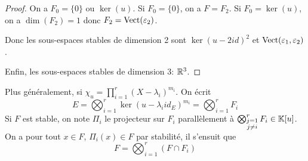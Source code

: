 \documentclass[12pt]{article}
\begin{document}
\begin{proof}
	On a $F_{0}=\lbrace0\rbrace$ ou $\ker(u)$. Si $F_{0}=\lbrace0\rbrace$, on a $F=F_{2}$. Si $F_{0}=\ker(u)$, on a $\dim(F_{2})=1$ donc $F_{2}=\operatorname{Vect}(\varepsilon_{2})$.

	Donc les sous-espaces stables de dimension 2 sont $\ker(u-2id)^{2}$ et $\operatorname{Vect}(\varepsilon_{1},\varepsilon_{2})$. 

	Enfin, les sous-espaces stables de dimension 3: $\mathbb{R}^{3}$.
\end{proof}

\begin{remark}
	Plus généralement, si $\chi_{u}=\prod_{i=1}^{r}(X-\lambda_{i})^{m_{i}}$. On écrit 
	\begin{equation}
		E=\bigotimes_{i=1}^{r}\ker(u-\lambda_{i}id_{E})^{m_{i}}=\bigotimes_{i=1}^{r}F_{i}
	\end{equation}
	Si $F$ est stable, on note $\Pi_{i}$ le projecteur sur $F_{i}$ parallèlement à $\bigotimes_{\substack{j=1\\j\neq i}}^{r}F_{i}\in\mathbb{K}[u]$. On a pour tout $x\in F$, $\Pi_{i}(x)\in F$ par stabilité, il s'ensuit que 
	\begin{equation}
		\boxed{F=\bigotimes_{i=1}^{r}\left(F\cap F_{i}\right)}
	\end{equation}
\end{remark}
\end{document}
